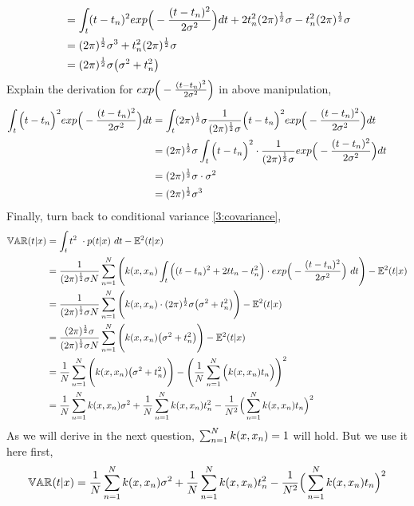 \documentclass[11pt,a4paper]{article}
\newcommand{\htab}{\hspace*{0.63cm}}
\newcommand{\half}{\frac{1}{2}}
\begin{document}
{\begin{align}
        & = \intt (t-t_{n})^{2} \expt dt + 2 t_{n}^{2} \gcoeffinv - t_{n}^{2} \gcoeffinv \\
        & = (2\pi)^{\half} \sigma^{3} + t_{n}^{2} \gcoeffinv  \\
        & = \gcoeffinv \big( \sigma^{2} + t_{n}^{2} \big)
    \end{align}
\htab Explain the derivation for $exp \Big( - \frac{(t-t_{n})^{2}}{2\sigma^{2}} \Big)$ in above manipulation,
    \begin{align}
        \intt \Big( t-t_{n} \Big)^{2} \expt dt 
        &= \intt \gcoeffinv \gcoeff \Big( t-t_{n} \Big)^{2} \expt dt \\
        &= \gcoeffinv \intt \Big( t-t_{n} \Big)^{2} \cdot \gcoeff  \expt dt \\
        &= \gcoeffinv \cdot \sigma^{2} \\
        &= (2\pi)^{\half} \sigma^{3}
        &&\mbox{} \label{8:variance}
    \end{align}
    \htab Finally, turn back to conditional variance \eqref{3:covariance},
    \begin{align}
    \var(t|x)
        &= \intt t^{2}\ \cdot p(t|x) \ dt - \Et(t|x)  \\
        &= \frac{1}{\gcoeffinv N}  \sumn  \Bigg( \kx 
        \intt \Big( (t-t_{n})^{2} + 2tt_{n} -  t_{n}^{2} \Big) \cdot \expt \ dt \Bigg) - \Et(t|x)  \\
        &= \frac{1}{\gcoeffinv N}  \sumn  \Bigg( \kx 
        \cdot \gcoeffinv \big( \sigma^{2} +  t_{n}^{2} \big) \Bigg) - \Et(t|x)  \\
        &= \frac{\gcoeffinv}{\gcoeffinv N}  \sumn  \Bigg( \kx 
         \big( \sigma^{2} + t_{n}^{2} \big) \Bigg) - \Et(t|x)  \\
        &= \frac{1}{N}  \sumn  \Bigg( \kx 
         \big( \sigma^{2} +  t_{n}^{2} \big) \Bigg) - 
         \Bigg( \frac{1}{N} \sumn  \Big( \kx t_{n} \Big) \Bigg)^{2} \\
        &= \frac{1}{N}  \sumn   \kx \sigma^{2} +
         \frac{1}{N}  \sumn \kx t_{n}^{2} 
          - \frac{1}{N^{2}} \Big( \sumn \kx t_{n} \Big)^{2}
        \end{align}
\htab As we will derive in the next question, $\sum_{n=1}^{N} k(x,x_{n}) = 1$ will hold. But we use it here first,
\begin{align}
    \mathbb{VAR}(t|x) = \frac{1}{N}  \sum_{n=1}^{N}   k(x,x_{n}) \sigma^{2} +
         \frac{1}{N}  \sum_{n=1}^{N} k(x,x_{n}) t_{n}^{2} 
         - \frac{1}{N^{2}} \Big( \sum_{n=1}^{N} k(x,x_{n}) t_{n} \Big)^{2}
    \end{align}
\newpage
}
\end{document}
